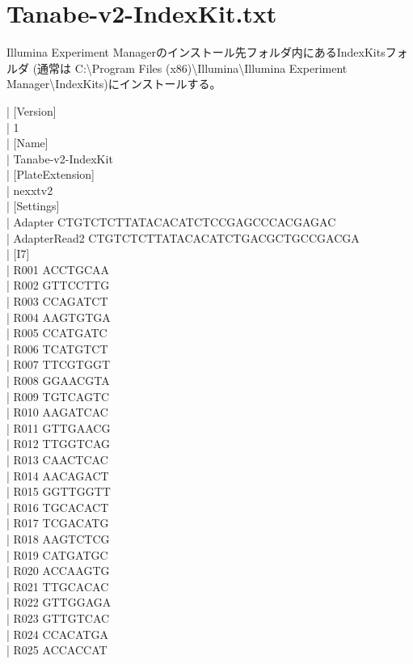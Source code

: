 \documentclass[titlepage,10pt,a4paper,uplatex]{jsbook}
\newenvironment{content}{\begin{shaded}\vspace{-1em}\raggedright\ttfamily\footnotesize\setlength{\baselineskip}{1.4em}}{\end{shaded}\vspace{-1em}}
\begin{document}
\section{Tanabe-v2-IndexKit.txt}

Illumina Experiment Managerのインストール先フォルダ内にあるIndexKitsフォルダ (通常は C:{\textbackslash}Program Files (x86){\textbackslash}Illumina{\textbackslash}Illumina Experiment Manager{\textbackslash}IndexKits)にインストールする。

\begin{content}
| [Version]\\
| 1\\
| [Name]\\
| Tanabe-v2-IndexKit\\
| [PlateExtension]\\
| nexxtv2\\
| [Settings]\\
| Adapter	CTGTCTCTTATACACATCTCCGAGCCCACGAGAC\\
| AdapterRead2	CTGTCTCTTATACACATCTGACGCTGCCGACGA\\
| [I7]\\
| R001	ACCTGCAA\\
| R002	GTTCCTTG\\
| R003	CCAGATCT\\
| R004	AAGTGTGA\\
| R005	CCATGATC\\
| R006	TCATGTCT\\
| R007	TTCGTGGT\\
| R008	GGAACGTA\\
| R009	TGTCAGTC\\
| R010	AAGATCAC\\
| R011	GTTGAACG\\
| R012	TTGGTCAG\\
| R013	CAACTCAC\\
| R014	AACAGACT\\
| R015	GGTTGGTT\\
| R016	TGCACACT\\
| R017	TCGACATG\\
| R018	AAGTCTCG\\
| R019	CATGATGC\\
| R020	ACCAAGTG\\
| R021	TTGCACAC\\
| R022	GTTGGAGA\\
| R023	GTTGTCAC\\
| R024	CCACATGA\\
| R025	ACCACCAT\\

\end{content}
\end{document}
